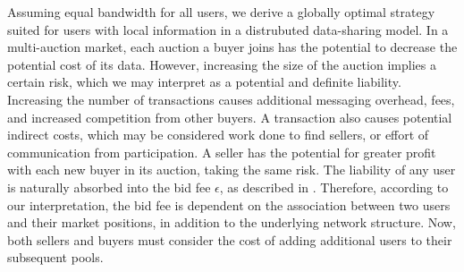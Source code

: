Assuming equal bandwidth for all users, we derive a globally optimal strategy suited for
users with local information in a distrubuted data-sharing model. 
In a multi-auction market, each auction a buyer joins has the potential to
decrease the potential cost of its data. However, increasing the size of the
auction implies a certain risk, which we may interpret as a potential and
definite
liability. Increasing the number of transactions causes additional messaging
overhead, fees, and increased competition from other buyers. 
A transaction also causes potential indirect costs, which may be considered work done to find
sellers, or effort of communication from participation. A seller
has the potential for greater profit with each new buyer in its auction, taking 
the same risk.
The liability of any user is naturally absorbed into the bid fee $\epsilon$,
as described in \cite{semret}. Therefore, according to our interpretation, the bid fee is
dependent on the association between two users and their market positions, in
addition to the underlying network structure. Now, both sellers and buyers must consider
the cost of adding additional users to their subsequent pools. 

